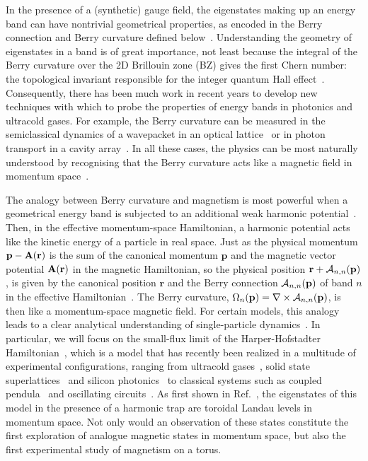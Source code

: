 \documentclass[twocolumn, 10pt, aps, superscriptaddress, floatfix, showpacs, pra, citeautoscript]{revtex4-1}
\newcommand{\vt}[1]{\mathbf{#1}}
\begin{document}
In the presence of a (synthetic) gauge field, the eigenstates making up an energy band can have nontrivial geometrical properties, as encoded in the Berry connection and Berry curvature defined below~\cite{berry, xiao2010berryreview}. Understanding the geometry of eigenstates in a band is of great importance, not least because the integral of the Berry curvature over the 2D Brillouin zone (BZ) gives the first Chern number: the topological invariant responsible for the integer quantum Hall effect~\cite{thouless}. Consequently, there has been much work in recent years to develop new techniques with which to probe the properties of energy bands in photonics and ultracold gases. For example, the Berry curvature can be measured in the semiclassical dynamics of a wavepacket in an optical lattice~\cite{dudarev,1chang, price, cominotti, dauphin, aidelsburger2015measuring, jotzu2014experimental} or in photon transport in a cavity array~\cite{ozawa2014qhe}. In all these cases, the physics can be most naturally understood by recognising that the Berry curvature acts like a magnetic field in momentum space~\cite{berry, bliokh2005spin, PhysRevD.12.3845, cooper2012designing}. 

The analogy between Berry curvature and magnetism is most powerful when a geometrical energy band is subjected to an additional weak harmonic potential~\cite{price2014magnetic}. Then, in the effective momentum-space Hamiltonian, a harmonic potential acts like the kinetic energy of a particle in real space. Just as the physical momentum $\vt{p}-\vt{A}({\bf r})$ is the sum of the canonical momentum $\vt{p}$ and the magnetic vector potential $\vt{A} ({\bf r})$ in the magnetic Hamiltonian, so the physical position $\vt{r}+\mathcal{A}_{n,n}({\bf p})$, is given by the canonical position $\vt{r}$ and the Berry connection $\mathcal{A}_{n,n}({\bf p})$ of band $n$ in the effective Hamiltonian~\cite{adams1959energy,nagaosa, murakami2003dissipationless, bliokh2005spin, fujita, bliokh2005topological,gosselin2006semiclassical}. The Berry curvature, $\Omega_n ({\bf p})= \nabla \times \mathcal{A}_{n,n}({\bf p})$, is then like a momentum-space magnetic field. For certain models, this analogy leads to a clear analytical understanding of single-particle dynamics~\cite{price2014magnetic, ozawa2014momhh, price2015sporbit, Claassen_prl_2015}. In particular, we will focus on the small-flux limit of the Harper-Hofstadter Hamiltonian~\cite{harper1955magnetic,hofstadter1976butterfly}, which is a model that has recently been realized in a multitude of experimental configurations,
ranging from ultracold
gases~\cite{aidelsburger2013hh,miyake2013hh,mancini2015edge,stuhl2015edge},
solid state superlattices~\cite{dean2013hofstadter,yu2014hierarchy}
and silicon photonics~\cite{hafezi2013imaging} to classical systems
such as coupled pendula~\cite{susstrunk2015pendula} and oscillating
circuits~\cite{jia2013circuits}. As first shown in Ref.~, the eigenstates of this model in the presence of a harmonic trap are toroidal Landau levels in momentum space. Not only would an observation of these states constitute the first exploration of analogue magnetic states in momentum space, but also the first experimental study of magnetism on a torus.  
 
\end{document}
